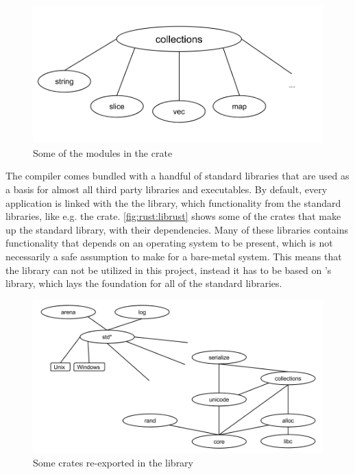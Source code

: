 \begin{figure}[H]
  \begin{center}
    \includegraphics[scale=0.3]{figures/background/rust/libcollections.png}
  \end{center}
  \caption{Some of the modules in the  crate}
  \label{fig:rust:collections}
\end{figure}

The {\rust} compiler comes bundled with a handful of standard libraries that are used as a basis for almost all third party libraries and executables.
By default, every {\rust} application is linked with the the {\rust} {\std} library, which  functionality from the standard libraries, like e.g. the  crate.
\autoref{fig:rust:librust} shows some of the crates that make up the standard library, with their dependencies.
Many of these libraries contains functionality that depends on an operating system to be present, which is not necessarily a safe assumption to make for a bare-metal system.
This means that the {\std} library can not be utilized in this project, instead it has to be based on {\rust}'s {\core} library, which lays the foundation for all of the standard libraries.

\begin{figure}[H]
  \begin{center}
    \includegraphics[scale=0.3]{figures/background/rust/rust-lib.png}
  \end{center}
  \caption{Some crates re-exported in the {\std} library}
  \label{fig:rust:librust}
\end{figure}

